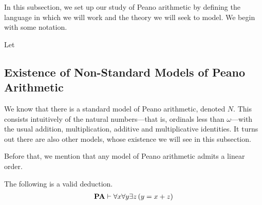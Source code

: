 In this subsection, we set up our study of Peano arithmetic by defining the language in which we will work and the theory we will seek to model. We begin with some notation.

\begin{boxnotation}
    Let 
\end{boxnotation}

\subsection{Existence of Non-Standard Models of Peano Arithmetic}

We know that there is a standard model of Peano arithmetic, denoted $N$. This consists intuitively of the natural numbers---that is, ordinals less than $\omega$---with the usual addition, multiplication, additive and multiplicative identities. It turns out there are also other models, whose existence we will see in this subsection.

Before that, we mention that any model of Peano arithmetic admits a linear order.

\begin{boxtheorem}
    The following is a valid deduction.
    \begin{align*}
        \mathbf{PA} \vdash \forall x \forall y \exists z \left( y = x + z \right)
    \end{align*}
\end{boxtheorem}


